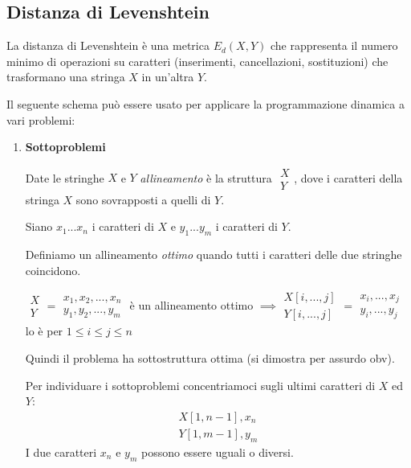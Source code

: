 \documentclass[a4paper,10pt]{article}
\theoremstyle{definition}
\begin{document}
\subsection{Distanza di Levenshtein}
La distanza di Levenshtein è una metrica $E_d(X, Y)$ che rappresenta il numero minimo di operazioni su caratteri (inserimenti, cancellazioni, sostituzioni) che trasformano una stringa $X$ in un'altra $Y$.\bigskip

Il seguente schema può essere usato per applicare la programmazione dinamica a vari problemi:

\begin{enumerate}
 \item \textbf{Sottoproblemi}
 
 Date le stringhe $X$ e $Y$ \emph{allineamento} è la struttura $\begin{matrix}
    X\\Y
 \end{matrix}
$, dove i caratteri della stringa $X$ sono sovrapposti a quelli di $Y$.

Siano $x_1 ... x_n$ i caratteri di $X$ e $y_1 ... y_m$ i caratteri di $Y$.

Definiamo un allineamento \emph{ottimo} quando tutti i caratteri delle due stringhe coincidono.
\begin{center}
$\begin{matrix}
    X\\Y
 \end{matrix}
 = \begin{matrix}
    x_1,x_2, ..., x_n\\ y_1, y_2, ..., y_m
 \end{matrix}$ è un allineamento ottimo $\implies \begin{matrix}
    X[i,...,j]\\Y[i,...,j]
 \end{matrix}
 = \begin{matrix}
    x_i, ..., x_j\\ y_i, ..., y_j
 \end{matrix}$ lo è per $1 \leq i \leq j \leq n$

\end{center}
 Quindi il problema ha sottostruttura ottima (si dimostra per assurdo obv).\smallskip
 
 Per individuare i sottoproblemi concentriamoci sugli ultimi caratteri di $X$ ed $Y$:
 \[\begin{matrix}
    X[1, n-1],x_n\\Y[1, m-1], y_m
 \end{matrix}\]
I due caratteri $x_n$ e $y_m$ possono essere uguali o diversi. 


\end{enumerate}
\end{document}
